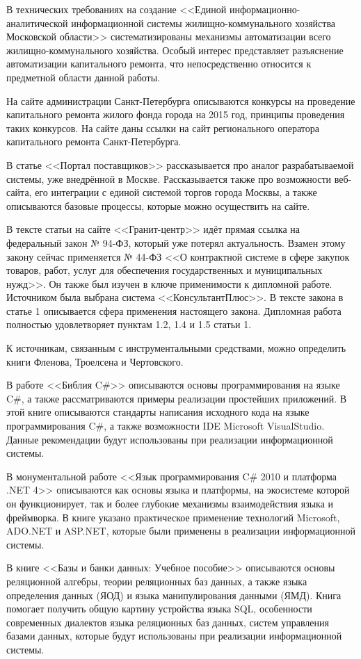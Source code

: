 В технических требованиях на создание <<Единой информационно-аналитической информационной системы жилищно-коммунального хозяйства Московской области>> систематизированы механизмы автоматизации всего жилищно-коммунального хозяйства.
Особый интерес представляет разъяснение автоматизации капитального ремонта, что непосредственно относится к предметной области данной работы.

На сайте администрации Санкт-Петербурга описываются конкурсы на проведение капитального ремонта жилого фонда города на 2015 год, принципы проведения таких конкурсов.
На сайте даны ссылки на сайт регионального оператора капитального ремонта Санкт-Петербурга.

В статье <<Портал поставщиков>> рассказывается про аналог разрабатываемой системы, уже внедрённой в Москве.
Рассказывается также про возможности веб-сайта, его интеграции с единой системой торгов города Москвы, а также описываются базовые процессы, которые можно осуществить на сайте.

В тексте статьи на сайте <<Гранит-центр>> идёт прямая ссылка на федеральный закон № 94-ФЗ, который уже потерял актуальность.
Взамен этому закону сейчас применяется № 44-ФЗ <<О контрактной системе в сфере закупок товаров, работ, услуг для обеспечения государственных и муниципальных нужд>>.
Он также был изучен в ключе применимости к дипломной работе.
Источником была выбрана система <<КонсультантПлюс>>.
В тексте закона в статье 1 описывается сфера применения настоящего закона. Дипломная работа полностью удовлетворяет пунктам 1.2, 1.4 и 1.5 статьи 1.

К источникам, связанным с инструментальными средствами, можно определить книги Фленова, Троелсена и Чертовского.

В работе <<Библия C\#>> описываются основы программирования на языке C\#, а также рассматриваются примеры реализации простейших приложений.
В этой книге описываются стандарты написания исходного кода на языке программирования C\#, а также возможности IDE Microsoft VisualStudio.
Данные рекомендации будут использованы при реализации информационной системы.

В монументальной работе <<Язык программирования C\# 2010 и платформа .NET 4>> описываются как основы языка и платформы, на экосистеме которой он функционирует, так и более глубокие механизмы взаимодействия языка и фреймворка.
В книге указано практическое применение технологий Microsoft, ADO.NET и ASP.NET, которые были применены в реализации информационной системы.

В книге <<Базы и банки данных: Учебное пособие>> описываются основы реляционной алгебры, теории реляционных баз данных, а также языка определения данных (ЯОД) и языка манипулирования данными (ЯМД).
Книга помогает получить общую картину устройства языка SQL, особенности современных диалектов языка реляционных баз данных, систем управления базами данных, которые будут использованы при реализации информационной системы.

